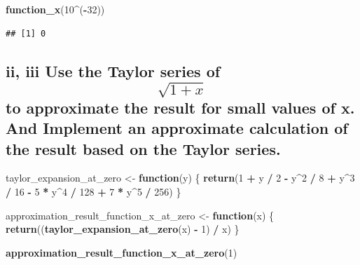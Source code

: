 \documentclass[
]{article}
\newenvironment{Shaded}{\begin{snugshade}}{\end{snugshade}}
\newcommand{\ControlFlowTok}[1]{\textcolor[rgb]{0.13,0.29,0.53}{\textbf{#1}}}
\newcommand{\DecValTok}[1]{\textcolor[rgb]{0.00,0.00,0.81}{#1}}
\newcommand{\FunctionTok}[1]{\textcolor[rgb]{0.13,0.29,0.53}{\textbf{#1}}}
\newcommand{\NormalTok}[1]{#1}
\newcommand{\OtherTok}[1]{\textcolor[rgb]{0.56,0.35,0.01}{#1}}
\newcommand{\SpecialCharTok}[1]{\textcolor[rgb]{0.81,0.36,0.00}{\textbf{#1}}}
\begin{document}
\begin{Shaded}
\begin{Highlighting}[]
\FunctionTok{function\_x}\NormalTok{(}\DecValTok{10}\SpecialCharTok{\^{}}\NormalTok{(}\SpecialCharTok{{-}}\DecValTok{32}\NormalTok{))}
\end{Highlighting}
\end{Shaded}

\begin{verbatim}
## [1] 0
\end{verbatim}

\subsection{\texorpdfstring{ii, iii Use the Taylor series of
\[\sqrt{1+x}\] to approximate the result for small values of x. And
Implement an approximate calculation of the result based on the Taylor
series.}{ii, iii Use the Taylor series of \textbackslash sqrt\{1+x\} to approximate the result for small values of x. And Implement an approximate calculation of the result based on the Taylor series.}}\label{ii-iii-use-the-taylor-series-of-sqrt1x-to-approximate-the-result-for-small-values-of-x.-and-implement-an-approximate-calculation-of-the-result-based-on-the-taylor-series.}

\begin{Shaded}
\begin{Highlighting}[]
\NormalTok{taylor\_expansion\_at\_zero }\OtherTok{\textless{}{-}} \ControlFlowTok{function}\NormalTok{(y) \{}
  \FunctionTok{return}\NormalTok{(}\DecValTok{1} \SpecialCharTok{+}\NormalTok{ y }\SpecialCharTok{/} \DecValTok{2} \SpecialCharTok{{-}}\NormalTok{ y}\SpecialCharTok{\^{}}\DecValTok{2} \SpecialCharTok{/} \DecValTok{8} \SpecialCharTok{+}\NormalTok{ y}\SpecialCharTok{\^{}}\DecValTok{3} \SpecialCharTok{/} \DecValTok{16} \SpecialCharTok{{-}} \DecValTok{5} \SpecialCharTok{*}\NormalTok{ y}\SpecialCharTok{\^{}}\DecValTok{4} \SpecialCharTok{/} \DecValTok{128} \SpecialCharTok{+} \DecValTok{7} \SpecialCharTok{*}\NormalTok{ y}\SpecialCharTok{\^{}}\DecValTok{5} \SpecialCharTok{/} \DecValTok{256}\NormalTok{)}
\NormalTok{\}}

\NormalTok{approximation\_result\_function\_x\_at\_zero }\OtherTok{\textless{}{-}} \ControlFlowTok{function}\NormalTok{(x) \{}
  \FunctionTok{return}\NormalTok{((}\FunctionTok{taylor\_expansion\_at\_zero}\NormalTok{(x) }\SpecialCharTok{{-}} \DecValTok{1}\NormalTok{) }\SpecialCharTok{/}\NormalTok{ x)}
\NormalTok{\}}

\FunctionTok{approximation\_result\_function\_x\_at\_zero}\NormalTok{(}\DecValTok{1}\NormalTok{)}
\end{Highlighting}
\end{Shaded}
\end{document}
